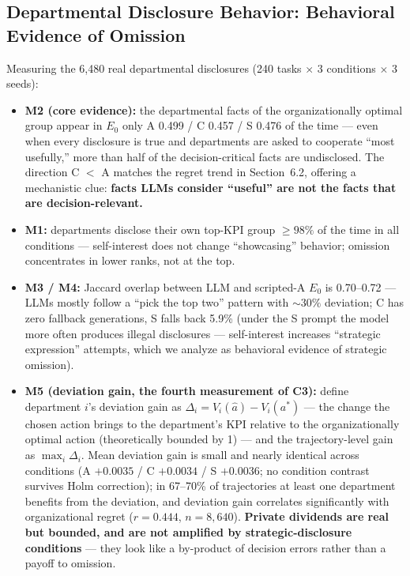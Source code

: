 \documentclass[letterpaper]{article}
\begin{document}
\subsection{Departmental Disclosure Behavior: Behavioral Evidence of Omission}
Measuring the 6{,}480 real departmental disclosures (240 tasks $\times$ 3 conditions $\times$ 3 seeds):
\begin{itemize}
\item \textbf{M2 (core evidence):} the departmental facts of the organizationally optimal group appear in $E_0$ only A 0.499 / C 0.457 / S 0.476 of the time --- even when every disclosure is true and departments are asked to cooperate ``most usefully,'' more than half of the decision-critical facts are undisclosed. The direction C $<$ A matches the regret trend in Section~6.2, offering a mechanistic clue: \textbf{facts LLMs consider ``useful'' are not the facts that are decision-relevant.}
\item \textbf{M1:} departments disclose their own top-KPI group ${\ge}98\%$ of the time in all conditions --- self-interest does not change ``showcasing'' behavior; omission concentrates in lower ranks, not at the top.
\item \textbf{M3 / M4:} Jaccard overlap between LLM and scripted-A $E_0$ is 0.70--0.72 --- LLMs mostly follow a ``pick the top two'' pattern with ${\sim}30\%$ deviation; C has zero fallback generations, S falls back 5.9\% (under the S prompt the model more often produces illegal disclosures --- self-interest increases ``strategic expression'' attempts, which we analyze as behavioral evidence of strategic omission).
\item \textbf{M5 (deviation gain, the fourth measurement of C3):} define department $i$'s deviation gain as $\Delta_i = V_i(\hat a) - V_i(a^*)$ --- the change the chosen action brings to the department's KPI relative to the organizationally optimal action (theoretically bounded by 1) --- and the trajectory-level gain as $\max_i \Delta_i$. Mean deviation gain is small and nearly identical across conditions (A $+0.0035$ / C $+0.0034$ / S $+0.0036$; no condition contrast survives Holm correction); in 67--70\% of trajectories at least one department benefits from the deviation, and deviation gain correlates significantly with organizational regret ($r{=}0.444$, $n{=}8{,}640$). \textbf{Private dividends are real but bounded, and are not amplified by strategic-disclosure conditions} --- they look like a by-product of decision errors rather than a payoff to omission.
\end{itemize}
\end{document}
